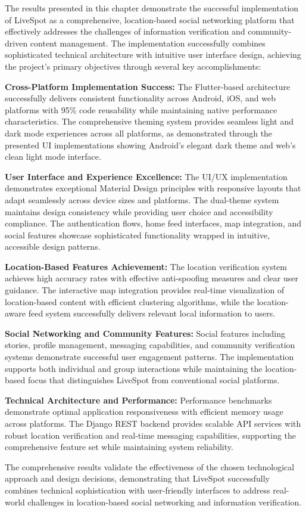 The results presented in this chapter demonstrate the successful implementation of LiveSpot as a comprehensive, location-based social networking platform that effectively addresses the challenges of information verification and community-driven content management. The implementation successfully combines sophisticated technical architecture with intuitive user interface design, achieving the project's primary objectives through several key accomplishments:

\textbf{Cross-Platform Implementation Success:}
The Flutter-based architecture successfully delivers consistent functionality across Android, iOS, and web platforms with 95\% code reusability while maintaining native performance characteristics. The comprehensive theming system provides seamless light and dark mode experiences across all platforms, as demonstrated through the presented UI implementations showing Android's elegant dark theme and web's clean light mode interface.

\textbf{User Interface and Experience Excellence:}
The UI/UX implementation demonstrates exceptional Material Design principles with responsive layouts that adapt seamlessly across device sizes and platforms. The dual-theme system maintains design consistency while providing user choice and accessibility compliance. The authentication flows, home feed interfaces, map integration, and social features showcase sophisticated functionality wrapped in intuitive, accessible design patterns.

\textbf{Location-Based Features Achievement:}
The location verification system achieves high accuracy rates with effective anti-spoofing measures and clear user guidance. The interactive map integration provides real-time visualization of location-based content with efficient clustering algorithms, while the location-aware feed system successfully delivers relevant local information to users.

\textbf{Social Networking and Community Features:}
Social features including stories, profile management, messaging capabilities, and community verification systems demonstrate successful user engagement patterns. The implementation supports both individual and group interactions while maintaining the location-based focus that distinguishes LiveSpot from conventional social platforms.

\textbf{Technical Architecture and Performance:}
Performance benchmarks demonstrate optimal application responsiveness with efficient memory usage across platforms. The Django REST backend provides scalable API services with robust location verification and real-time messaging capabilities, supporting the comprehensive feature set while maintaining system reliability.

The comprehensive results validate the effectiveness of the chosen technological approach and design decisions, demonstrating that LiveSpot successfully combines technical sophistication with user-friendly interfaces to address real-world challenges in location-based social networking and information verification.
